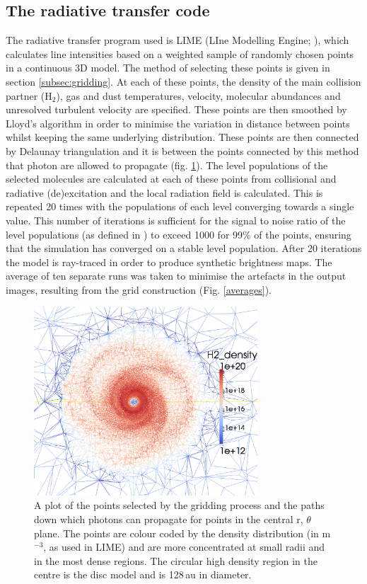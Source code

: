 \documentclass[useAMS,usenatbib]{mn2e}
\begin{document}
\subsection{The radiative transfer code} \label{subsec:radiative_transfer_code}
The radiative transfer program used is LIME (LIne Modelling Engine; \citealt{Brinch2010}), which  calculates line intensities based on a weighted sample of randomly chosen points in a continuous 3D model. The method of selecting these points is given in section \ref{subsec:gridding}. At each of these points, the density of the main collision partner (H$_2$), gas and dust temperatures, velocity, molecular abundances and unresolved turbulent velocity are specified. These points are then smoothed by Lloyd's algorithm \citep{Lloyd1982} in order to minimise the variation in distance between points whilst keeping the same underlying distribution. These points are then connected by Delaunay triangulation and it is between the points connected by this method that photon are allowed to propagate (fig. \ref{grid}). The level populations of the selected molecules are calculated at each of these points from collisional and radiative (de)excitation and the local radiation field is calculated. This is repeated 20 times with the populations of each level converging towards a single value. This number of iterations is sufficient for the signal to noise ratio of the level populations (as defined in \citealt{Brinch2010}) to exceed 1000 for 99\% of the points, ensuring that the simulation has converged on a stable level population. After 20 iterations the model is ray-traced in order to produce synthetic brightness maps. The average of ten separate runs was taken to minimise the artefacts in the output images, resulting from the grid construction (Fig. \ref{averages}).


\begin{figure}
 \includegraphics[width=84mm]{Figures/model/fig05.eps}
 \caption{A plot of the points selected by the gridding process and the paths down which photons can propagate for points in the central r, $\theta$ plane. The points are colour coded by the density distribution (in m$^{-3}$, as used in LIME) and are more concentrated at small radii and in the most dense regions. The circular high density region in the centre is the disc model and is 128$\,$au in diameter.}
 \label{grid}
\end{figure}
\end{document}
